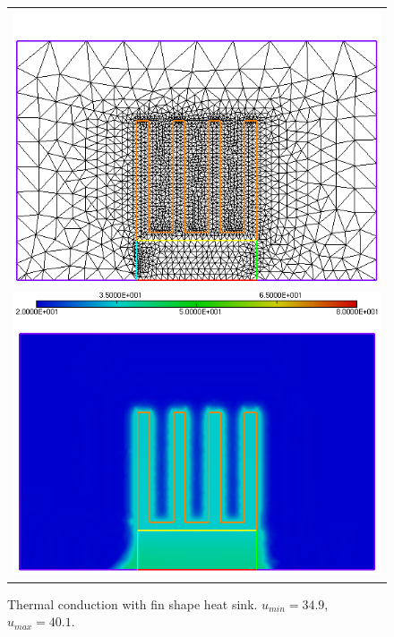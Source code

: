 \begin{figure}[ht]
	\centering
	\begin{tabular}{c}
		\includegraphics[width=.8\linewidth]{figures/finsinkc} \\ \includegraphics[width=.8\linewidth]{figures/finsinkb}
	\end{tabular}
	\caption{Thermal conduction with fin shape heat sink. $u_{min}=34.9$, $u_{max}=40.1$.}
	\label{fig:finsink}
\end{figure}
